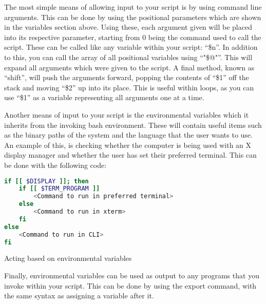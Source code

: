 			The most simple means of allowing input to your script is by using command line arguments. 
			This can be done by using the positional parameters which are shown in the variables section above. 
			Using these, each argument given will be placed into its respective parameter, starting from 0 being the command used to call the script. 
			These can be called like any variable within your script: ``\$n''.
			In addition to this, you can call the array of all positional variables using ``"\$@"''. 
			This will expand all arguments which were given to the script. 
			A final method, known as ``shift'', will push the arguments forward, popping the contents of ``\$1'' off the stack and moving ``\$2'' up into its place. 
			This is useful within loops, as you can use ``\$1'' as a variable representing all arguments one at a time. 

			Another means of input to your script is the environmental variables which it inherits from the invoking bash environment. 
			These will contain useful items such as the binary paths of the system and the language that the user wants to use. 
			An example of this, is checking whether the computer is being used with an X display manager and whether the user has set their preferred terminal.  
			This can be done with the following code:
			\begin{code}
			\begin{lstlisting}[language=bash]
if [[ $DISPLAY ]]; then
	if [[ $TERM_PROGRAM ]]
		<Command to run in preferred terminal>
	else
		<Command to run in xterm>
	fi
else
	<Command to run in CLI>
fi
			\end{lstlisting}
			\label{code:checkingEnvironmentalVariables}
			\caption{Acting based on environmental variables}
			\end{code}
			Finally, environmental variables can be used as output to any programs that you invoke within your script. 
			This can be done by using the export command, with the same syntax as assigning a variable after it. 
			
